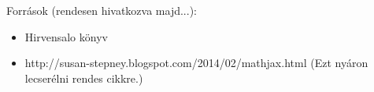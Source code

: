 \documentclass[11pt,a4paper,oneside]{report}
\begin{document}

\tableofcontents\vfill
{}








\nocite{*}

Források (rendesen hivatkozva majd...):
\begin{itemize}
  \item Hirvensalo könyv
  \item http://susan-stepney.blogspot.com/2014/02/mathjax.html (Ezt nyáron lecserélni rendes cikkre.)
\end{itemize}


\end{document}
